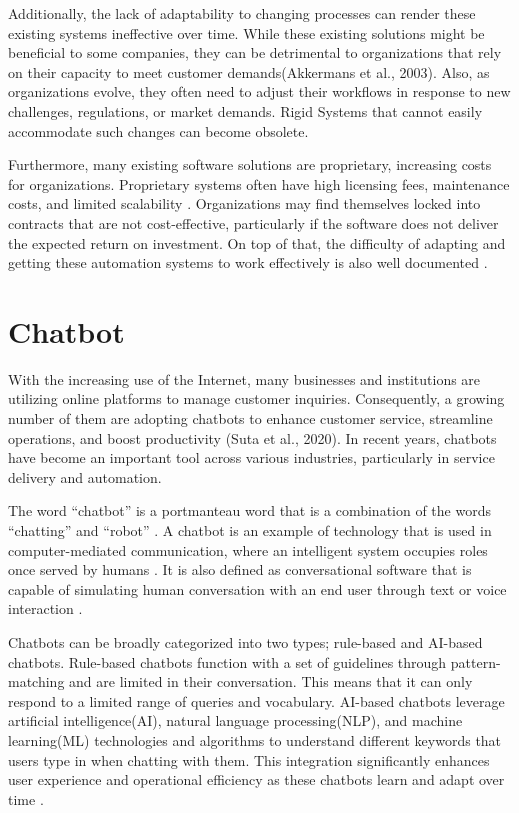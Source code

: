 Additionally, the lack of adaptability to changing processes can render these existing systems ineffective over time. While these existing solutions might be beneficial to some companies, they can be detrimental to organizations that rely on their capacity to meet customer demands(Akkermans et al., 2003). Also, as organizations evolve, they often need to adjust their workflows in response to new challenges, regulations, or market demands. Rigid Systems that cannot easily accommodate such changes can become obsolete. 

Furthermore, many existing software solutions are proprietary, increasing costs for organizations. Proprietary systems often have high licensing fees, maintenance costs, and limited scalability \cite{goel2012, prasad2013}. Organizations may find themselves locked into contracts that are not cost-effective, particularly if the software does not deliver the expected return on investment. On top of that, the difficulty of adapting and getting these automation systems to work effectively is also well documented \cite{adams2011}.


\section{Chatbot}
With the increasing use of the Internet, many businesses and institutions are utilizing online platforms to manage customer inquiries. Consequently, a growing number of them are adopting chatbots to enhance customer service, streamline operations, and boost productivity (Suta et al., 2020). In recent years, chatbots have become an important tool across various industries, particularly in service delivery and automation.

The word “chatbot” is a portmanteau word that is a combination of the words “chatting” and “robot” \cite{rese2020}. A chatbot is an example of technology that is used in computer-mediated communication, where an intelligent system occupies roles once served by humans \cite{beattie2020}. It is also defined as conversational software that is capable of simulating human conversation with an end user through text or voice interaction \cite{Naruzzaman}.

Chatbots can be broadly categorized into two types; rule-based and AI-based chatbots. Rule-based chatbots function with a set of guidelines through pattern-matching and are limited in their conversation. This means that it can only respond to a limited range of queries and vocabulary. AI-based chatbots leverage artificial intelligence(AI), natural language processing(NLP), and machine learning(ML) technologies and algorithms to understand different keywords that users type in when chatting with them. This integration significantly enhances user experience and operational efficiency as these chatbots learn and adapt over time \cite{Kar2016}.

